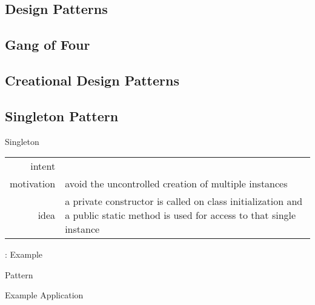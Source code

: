 \subsection{Design Patterns}
\slideDesignPatterns

\subsection{Gang of Four}
\slideGangOfFour

\subsection{Creational Design Patterns}
\begin{frame}{\insertsubsection{} \mytitlesource{\gof}}
	\centering{}
\end{frame}

\subsection{Singleton Pattern}
\begin{frame}{\insertsubsection}
	\begin{fancycolumns}
		\begin{definition}{Singleton \mysource{\gofen}}
			\setlength\tabcolsep{1mm}
			\begin{tabularx}{\textwidth}{rX}				
				intent & \mycite{Ensure a class [has only] one instance, and provide a global point of access to it.}\\
				motivation & avoid the uncontrolled creation of multiple instances\\
				idea & a private constructor is called on class initialization and a public static method is used for access to that single instance
			\end{tabularx}
		\end{definition}
		\nextcolumn
		\centering{}
	\end{fancycolumns}
\end{frame}

\begin{frame}{\insertsubsection: Example}
	\begin{fancycolumns}
		\begin{definitiontight}{Pattern}
			\centering\singleton{width=.5\linewidth}		
		\end{definitiontight}
		\nextcolumn
		\begin{exampletight}{Example Application}
			\centering\singletonexample{width=.5\linewidth}
		\end{exampletight}
	\end{fancycolumns}
\end{frame}

